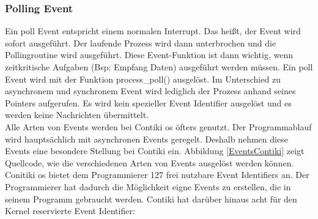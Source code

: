 	\subsubsection{Polling Event}
	Ein poll Event entspricht einem normalen Interrupt. Das heißt, der Event wird sofort ausgeführt. Der laufende Prozess wird dann unterbrochen und die Pollingroutine wird ausgeführt. Diese Event-Funktion ist dann wichtig, wenn zeitkritische Aufgaben (Bsp: Empfang Daten) ausgeführt werden müssen. Ein poll Event wird mit der Funktion process\_poll() ausgelöst. Im Unterschied zu asynchronem und synchronem Event wird lediglich der Prozess anhand seines Pointers aufgerufen. Es wird kein spezieller Event Identifier ausgelöst und es werden keine Nachrichten übermittelt.\\
	
	Alle Arten von Events werden bei Contiki \ac{os} öfters genutzt. Der Programmablauf wird hauptsächlich mit asynchronen Events geregelt. Deshalb nehmen diese Events eine besondere Stellung bei Contiki ein. Abbildung \ref{EventsContiki} zeigt Quellcode, wie die verschiedenen Arten von Events ausgelöst werden können.\\
	Conitiki \ac{os} bietet dem Programmierer 127 frei nutzbare Event Identifiers an. Der Programmierer hat dadurch die Möglichkeit eigne Events zu erstellen, die in seinem Programm gebraucht werden. Contiki hat darüber hinaus acht für den Kernel reservierte Event Identifier:
